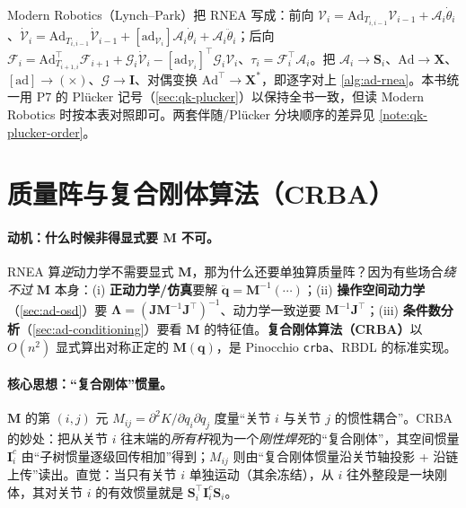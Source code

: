 \begin{note}
\label{note:ad-mr-vs-fw}
Modern Robotics（Lynch--Park）把 RNEA 写成：前向 $\mathcal{V}_i=\mathrm{Ad}_{T_{i,i-1}}\mathcal{V}_{i-1}+\mathcal{A}_i\dot{\theta}_i$、$\dot{\mathcal{V}}_i=\mathrm{Ad}_{T_{i,i-1}}\dot{\mathcal{V}}_{i-1}+[\mathrm{ad}_{\mathcal{V}_i}]\mathcal{A}_i\dot{\theta}_i+\mathcal{A}_i\ddot{\theta}_i$；后向 $\mathcal{F}_i=\mathrm{Ad}^\top_{T_{i+1,i}}\mathcal{F}_{i+1}+\mathcal{G}_i\dot{\mathcal{V}}_i-[\mathrm{ad}_{\mathcal{V}_i}]^\top\mathcal{G}_i\mathcal{V}_i$、$\tau_i=\mathcal{F}_i^\top\mathcal{A}_i$\cite{lynch2017modern}。把 $\mathcal{A}_i\!\to\!\mathbf{S}_i$、$\mathrm{Ad}\!\to\!\mathbf{X}$、$[\mathrm{ad}]\!\to\!(\times)$、$\mathcal{G}\!\to\!\mathbf{I}$、对偶变换 $\mathrm{Ad}^\top\!\to\!\mathbf{X}^*$，即逐字对上 \cref{alg:ad-rnea}。本书统一用 P7 的 Plücker 记号（\cref{sec:qk-plucker}）以保持全书一致，但读 Modern Robotics 时按本表对照即可。两套伴随/Plücker 分块顺序的差异见 \cref{note:qk-plucker-order}。
\end{note}

\section{质量阵与复合刚体算法（CRBA）}
\label{sec:ad-crba}

\paragraph{动机：什么时候非得显式要 $\mathbf{M}$ 不可。}
RNEA 算\emph{逆}动力学不需要显式 $\mathbf{M}$，那为什么还要单独算质量阵？因为有些场合\emph{绕不过} $\mathbf{M}$ 本身：(i) \textbf{正动力学/仿真}要解 $\ddot{\mathbf{q}}=\mathbf{M}^{-1}(\cdots)$；(ii) \textbf{操作空间动力学}（\cref{sec:ad-osd}）要 $\boldsymbol{\Lambda}=(\mathbf{J}\mathbf{M}^{-1}\mathbf{J}^\top)^{-1}$、动力学一致逆要 $\mathbf{M}^{-1}\mathbf{J}^\top$；(iii) \textbf{条件数分析}（\cref{sec:ad-conditioning}）要看 $\mathbf{M}$ 的特征值。\textbf{复合刚体算法（CRBA）}以 $O(n^2)$ 显式算出对称正定的 $\mathbf{M}(\mathbf{q})$，是 Pinocchio \texttt{crba}、RBDL 的标准实现\cite{featherstone2008rbda}。

\paragraph{核心思想：“复合刚体”惯量。}
$\mathbf{M}$ 的第 $(i,j)$ 元 $M_{ij}=\partial^2 K/\partial\dot{q}_i\partial\dot{q}_j$ 度量“关节 $i$ 与关节 $j$ 的惯性耦合”。CRBA 的妙处：把从关节 $i$ 往末端的\emph{所有杆}视为一个\emph{刚性焊死}的“复合刚体”，其空间惯量 $\mathbf{I}^c_i$ 由“子树惯量逐级回传相加”得到；$M_{ij}$ 则由“复合刚体惯量沿关节轴投影 + 沿链上传”读出。直觉：当只有关节 $i$ 单独运动（其余冻结），从 $i$ 往外整段是一块刚体，其对关节 $i$ 的有效惯量就是 $\mathbf{S}_i^\top\mathbf{I}^c_i\mathbf{S}_i$。

